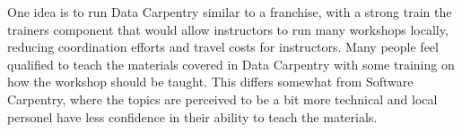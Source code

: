 \documentclass[11pt]{article}
\begin{document}
One idea is to run Data Carpentry similar to a franchise, with a strong train the 
trainers component that would allow instructors to run many workshops locally, 
reducing coordination efforts and travel costs for instructors. Many people feel 
qualified to teach the materials covered in Data Carpentry with some training on 
how the workshop should be taught. This differs somewhat from Software Carpentry, where
the topics are perceived to be a bit more technical and local personel have less 
confidence in their ability to teach the materials.
\end{document}

